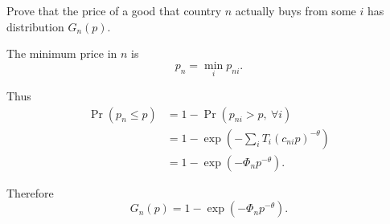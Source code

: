 
Prove that the price of a good that country $n$ actually buys from some $i$ has distribution $G_n(p)$.


\begin{solution}
The minimum price in $n$ is
\[
p_n = \min_i p_{ni}.
\]

Thus
\begin{align*}
\Pr(p_n \leq p) 
&= 1 - \Pr(p_{ni} > p, \ \forall i) \\
&= 1 - \exp\!\left(-\sum_i T_i (c_{ni} p)^{-\theta}\right) \\
&= 1 - \exp(-\Phi_n p^{-\theta}).
\end{align*}

Therefore
\[
G_n(p) = 1 - \exp(-\Phi_n p^{-\theta}).
\]
\end{solution}
